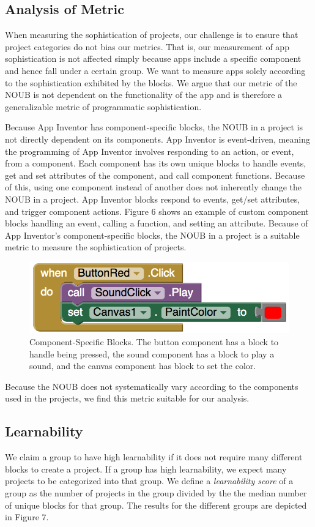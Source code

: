 \documentclass[conference]{IEEEtran}
\begin{document}
\subsection{Analysis of Metric}
When measuring the sophistication of projects, our challenge is to ensure that project categories do not bias our metrics. That is, our measurement of app sophistication is not affected simply because apps include a specific component and hence fall under a certain group. We want to measure apps solely according to the sophistication exhibited by the blocks. We argue that our metric of the NOUB is not dependent on the functionality of the app and is therefore a generalizable metric of programmatic sophistication.

Because App Inventor has component-specific blocks, the NOUB in a project is not directly dependent on its components. App Inventor is event-driven, meaning the programming of App Inventor involves responding to an action, or event, from a component. Each component has its own unique blocks to handle events, get and set attributes of the component, and call component functions. Because of this, using one component instead of another does not inherently change the NOUB in a project. App Inventor blocks respond to events, get/set attributes, and trigger component actions. Figure 6 shows an example of custom component blocks handling an event, calling a function, and setting an attribute. Because of App Inventor's component-specific blocks, the NOUB in a project is a suitable metric to measure the sophistication of projects.

\begin{figure}[h!]
	\centering
	\includegraphics[width=0.8\linewidth]{component_blocks.png}
	\caption{Component-Specific Blocks. The button component has a block to handle being pressed, the sound component has a block to play a sound, and the canvas component has block to set the color.}
	\label{component_specific_blocks}
\end{figure}

Because the NOUB does not systematically vary according to the components used in the projects, we find this metric suitable for our analysis.

\subsection{Learnability}
We claim a group to have high learnability if it does not require many different blocks to create a project. If a group has high learnability, we expect many projects to be categorized into that group. We define a \emph{learnability score} of a group as the number of projects in the group divided by the the median number of unique blocks for that group. The results for the different groups are depicted in Figure 7. 
\end{document}
